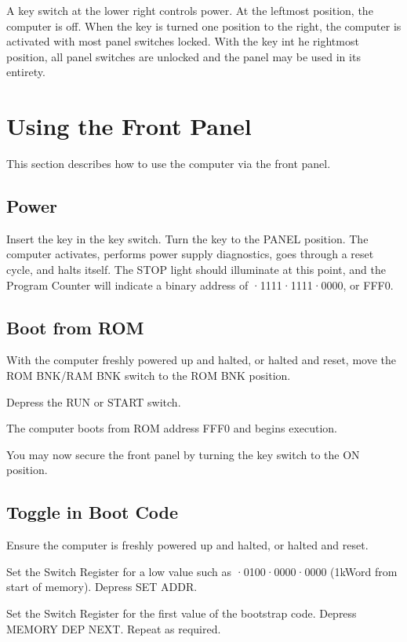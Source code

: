 \documentclass[11pt,a4paper,twocolumns]{article}
\newcommand{\lt}[1]{\textsf{#1}}
\newcommand{\sw}[1]{\textsf{#1}}
\begin{document}
A key switch at the lower right controls power. At the leftmost position, the
computer is off. When the key is turned one position to the right, the computer
is activated with most panel switches locked. With the key int he rightmost
position, all panel switches are unlocked and the panel may be used in its
entirety.

\section{Using the Front Panel}

This section describes how to use the computer via the front panel.

\subsection{Power}

Insert the key in the key switch. Turn the key to the \sw{PANEL}
position. The computer activates, performs power supply diagnostics,
goes through a reset cycle, and halts itself. The \lt{STOP} light
should illuminate at this point, and the Program Counter will indicate
a binary address of {·1111·1111·0000}, or {\sf FFF0}.

\subsection{Boot from ROM}

With the computer freshly powered up and halted, or halted and reset,
move the \sw{ROM BNK}/\sw{RAM BNK} switch to the \sw{ROM BNK}
position.

Depress the \sw{RUN} or \sw{START} switch.

The computer boots from ROM address {\sf FFF0} and begins execution.

You may now secure the front panel by turning the key switch to the
\sw{ON} position.

\subsection{Toggle in Boot Code}

Ensure the computer is freshly powered up and halted, or halted and reset.

Set the Switch Register for a low value such as {·0100·0000·0000} (1kWord from start of memory). Depress \sw{SET
  ADDR}.

Set the Switch Register for the first value of the bootstrap
code. Depress \sw{MEMORY DEP NEXT}. Repeat as required.
\end{document}
